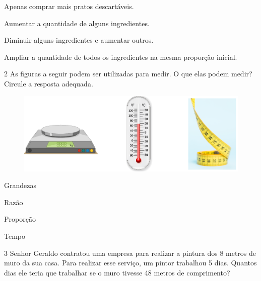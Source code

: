 \begin{escolha}
\item
  Apenas comprar mais pratos descartáveis.
\item
  Aumentar a quantidade de alguns ingredientes.
\item
  Diminuir alguns ingredientes e aumentar outros.
\item
  Ampliar a quantidade de todos os ingredientes na mesma proporção inicial.
\end{escolha}


\num{2} As figuras a seguir podem ser utilizadas para medir. O que elas podem medir? Circule a resposta adequada.

\begin{figure}[htpb!]
\centering
\includegraphics[width=.8\textwidth]{../ilustracoes/MAT5/SAEB_5ANO_MAT_figura78.png}
\end{figure}

\begin{escolha}
\item
  Grandezas
\item
  Razão
\item
  Proporção
\item
  Tempo
\end{escolha}


\num{3} Senhor Geraldo contratou uma empresa para realizar a pintura dos 8
metros de muro da sua casa. Para realizar esse serviço, um pintor
trabalhou 5 dias. Quantos dias ele teria que trabalhar se o muro tivesse
48 metros de comprimento?

